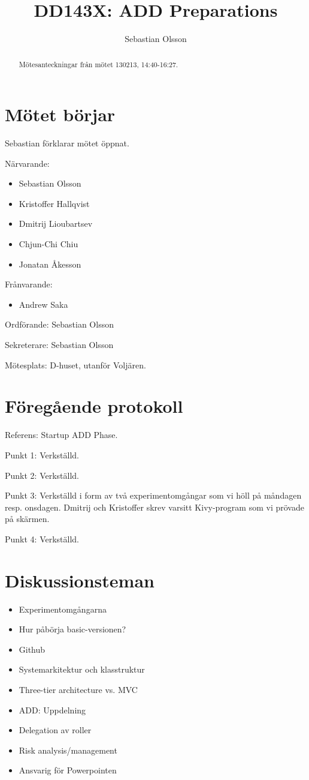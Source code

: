 \documentclass[a4paper,12pt]{article}
\author{Sebastian Olsson}
\title{DD143X: ADD Preparations}
\begin{document}
\maketitle
\begin{abstract}
    Mötesanteckningar från mötet 130213, 14:40-16:27.
\end{abstract}

\section{Mötet börjar}
Sebastian förklarar mötet öppnat.

Närvarande:
\begin{itemize}
\item Sebastian Olsson
\item Kristoffer Hallqvist
\item Dmitrij Lioubartsev
\item Chjun-Chi Chiu
\item Jonatan Åkesson
\end{itemize}
Frånvarande:
\begin{itemize}
\item Andrew Saka
\end{itemize}

Ordförande: Sebastian Olsson

Sekreterare: Sebastian Olsson

Mötesplats: D-huset, utanför Voljären.

\section{Föregående protokoll}
Referens: Startup ADD Phase.

Punkt 1: Verkställd.

Punkt 2: Verkställd.

Punkt 3: Verkställd i form av två experimentomgångar som vi höll på måndagen resp. onsdagen.
Dmitrij och Kristoffer skrev varsitt Kivy-program som vi prövade på skärmen.

Punkt 4: Verkställd.

\section{Diskussionsteman}
\begin{itemize}
\item Experimentomgångarna
\item Hur påbörja basic-versionen?
\item Github
\item Systemarkitektur och klasstruktur
\item Three-tier architecture vs. MVC
\item ADD: Uppdelning
\item Delegation av roller
\item Risk analysis/management
\item Ansvarig för Powerpointen
\end{itemize}
\end{document}

